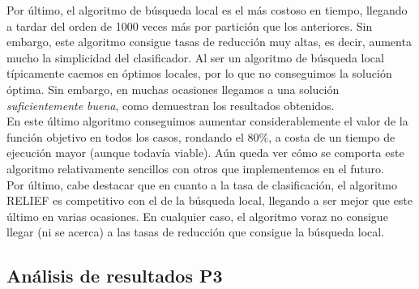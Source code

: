 \documentclass[12pt]{article}
\begin{document}
Por último, el algoritmo de búsqueda local es el más costoso en tiempo, llegando a tardar del orden de 1000 veces más por partición que los anteriores. Sin embargo, este algoritmo consigue tasas de reducción muy altas, es decir, aumenta mucho la simplicidad del clasificador. Al ser un algoritmo de búsqueda local típicamente caemos en óptimos locales, por lo que no conseguimos la solución óptima. Sin embargo, en muchas ocasiones llegamos a una solución \textit{suficientemente buena}, como demuestran los resultados obtenidos.\\

En este último algoritmo conseguimos aumentar considerablemente el valor de la función objetivo en todos los casos, rondando el 80$\%$, a costa de un tiempo de ejecución mayor (aunque todavía viable). Aún queda ver cómo se comporta este algoritmo relativamente sencillos con otros que implementemos en el futuro.\\

Por último, cabe destacar que en cuanto a la tasa de clasificación, el algoritmo RELIEF es competitivo con el de la búsqueda local, llegando a ser mejor que este último en varias ocasiones. En cualquier caso, el algoritmo voraz no consigue llegar (ni se acerca) a las tasas de reducción que consigue la búsqueda local.

\subsection*{Análisis de resultados P3}
\label{analisis}
\end{document}
